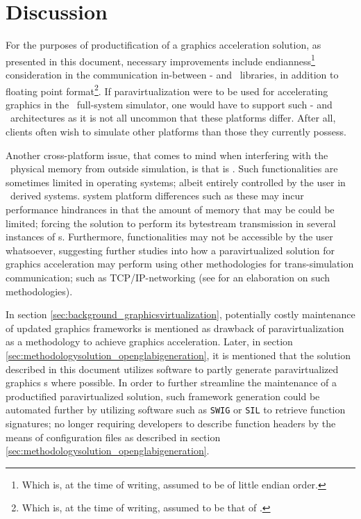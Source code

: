 
\chapter{Discussion}
\label{cha:discussion}
For the purposes of productification of a graphics acceleration solution, as presented in this document, necessary improvements include endianness\footnote{Which is, at the time of writing, assumed to be of little endian order.} consideration in the communication in-between \dvttermtarget - and \dvttermhost\ libraries, in addition to floating point format\footnote{Which is, at the time of writing, assumed to be that of \dvttermieeefp .}.
If paravirtualization were to be used for accelerating graphics in the \dvttermsimics\ full-system simulator, one would have to support such \dvttermtarget - and \dvttermhost\ architectures as it is not all uncommon that these platforms differ.
After all, clients often wish to simulate other platforms than those they currently possess.

Another cross-platform issue, that comes to mind when interfering with the \dvttermtarget\ physical memory from outside simulation, is that is .
Such functionalities are sometimes limited in operating systems; albeit entirely controlled by the user in \dvttermlinux\ derived systems.
 system platform differences such as these may incur performance hindrances in that the amount of memory that may be  could be limited; forcing the solution to perform its bytestream transmission in several instances of \dvttermmagicinstruction s.
Furthermore,  functionalities may not be accessible by the user whatsoever, suggesting further studies into how a paravirtualized solution for graphics acceleration may perform using other methodologies for trans-simulation communication; such as TCP/IP-networking (see  for an elaboration on such methodologies).

In section \ref{sec:background_graphicsvirtualization}, potentially costly maintenance of updated graphics frameworks is mentioned as drawback of paravirtualization as a methodology to achieve graphics acceleration.
Later, in section \ref{sec:methodologysolution_openglabigeneration}, it is mentioned that the solution described in this document utilizes software to partly generate paravirtualized graphics \dvttermabi s where possible.
In order to further streamline the maintenance of a productified paravirtualized solution, such framework generation could be automated further by utilizing software such as \texttt{SWIG} or \texttt{SIL} to retrieve function signatures; no longer requiring developers to describe function headers by the means of configuration files as described in section \ref{sec:methodologysolution_openglabigeneration}.


